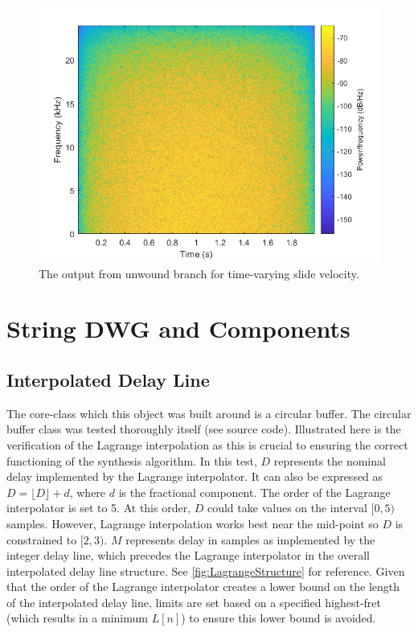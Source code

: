 \documentclass[../main.tex]{subfiles}
\begin{document}
\begin{figure}[h]
    \centering
    \includegraphics[scale=.65]{./images/plots/CSG_Unwound_TV.png}
    \caption{The output from unwound branch for time-varying slide velocity.}
    \label{fig:CSGUnwoundTVSpec}
\end{figure}

\section{String DWG and Components}

\subsection{Interpolated Delay Line}
The core-class which this object was built around is a circular buffer. The circular buffer class was tested thoroughly itself (see source code). Illustrated here is the verification of the Lagrange interpolation as this is crucial to ensuring the correct functioning of the synthesis algorithm. In this test, $D$ represents the nominal delay implemented by the Lagrange interpolator. It can also be expressed as $D = \lfloor D \rfloor + d$, where $d$ is the fractional component. The order of the Lagrange interpolator is set to 5. At this order, $D$ could take values on the interval $[0,5)$ samples. However, Lagrange interpolation works best near the mid-point so $D$ is constrained to $[2, 3)$. $M$ represents delay in samples as implemented by the integer delay line, which precedes the Lagrange interpolator in the overall interpolated delay line structure. See \ref{fig:LagrangeStructure} for reference. Given that the order of the Lagrange interpolator creates a lower bound on the length of the interpolated delay line, limits are set based on a specified highest-fret (which results in a minimum $L[n]$) to ensure this lower bound is avoided.
\end{document}
